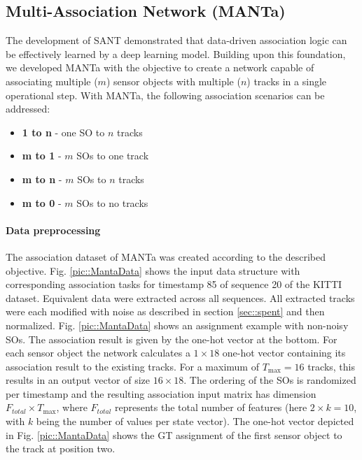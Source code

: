 \documentclass[letterpaper, 10 pt, journal, twoside]{IEEEtran}
\begin{document}
\subsection{Multi-Association Network (MANTa)}
The development of \ac{SANT} demonstrated that data-driven association logic can be effectively learned by a deep learning model.
Building upon this foundation, we developed MANTa with the objective to create a network capable of associating multiple ($m$) sensor objects with multiple ($n$) tracks in a single operational step.
With MANTa, the following association scenarios can be addressed:

\begin{itemize}
    \item \textbf{1 to n} - one \ac{SO} to $n$ tracks %
    \item \textbf{m to 1} - $m$ \acp{SO} to one track
    \item \textbf{m to n} - $m$ \acp{SO} to $n$ tracks
    \item \textbf{m to 0} - $m$ \acp{SO} to no tracks
\end{itemize}

\paragraph{Data preprocessing}
The association dataset of \ac{MANTa} was created according to the described objective.
Fig. {\ref{pic::MantaData}} shows the input data structure with corresponding association tasks for timestamp 85 of sequence 20 of the KITTI dataset. Equivalent data were extracted across all sequences.
All extracted tracks were each modified with noise as described in section \ref{sec::spent} and then normalized.
Fig. {\ref{pic::MantaData}} shows an assignment example with non-noisy \acp{SO}. The association result is given by the one-hot vector at the bottom.
For each sensor object the network calculates a $1 \times 18$ one-hot vector containing its association result to the existing tracks.
For a maximum of $T_{\max}=16$ tracks, this results in an output vector of size $16 \times 18$.
The ordering of the \ac{SO}s is randomized per timestamp and the resulting association input matrix has dimension $F_{total} \times T_{\max}$, where $F_{total}$ represents the total number of features (here $2 \times k=10$, with $k$ being the number of values per state vector).
The one-hot vector depicted in Fig. {\ref{pic::MantaData}} shows the GT assignment of the first sensor object to the track at position two.
\end{document}
